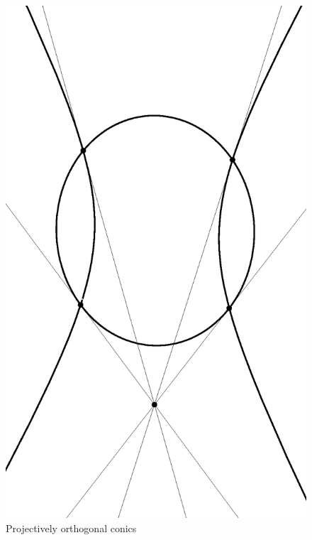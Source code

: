 \documentclass[letterpaper,11pt]{article}
\theoremstyle{definition}
\theoremstyle{remark}
\begin{document}
\begin{figure}[!htb]
\centering
\includegraphics[scale=0.5,angle=270]{orthogonal.eps}
\caption{Projectively orthogonal conics}
\end{figure}
\end{document}
